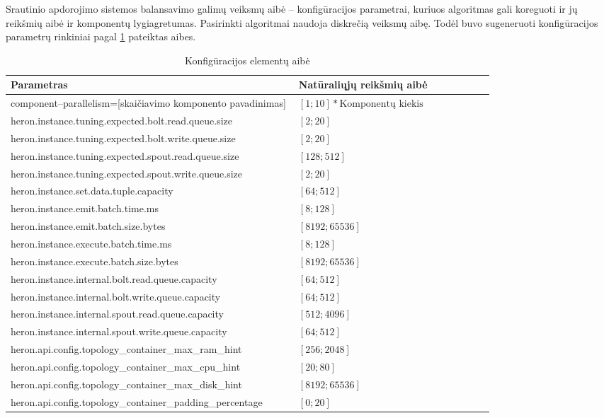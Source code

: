 \documentclass{VUMIFPSbakalaurinis}
\begin{document}
Srautinio apdorojimo sistemos balansavimo galimų veiksmų aibė – konfigūracijos parametrai, kuriuos algoritmas gali koreguoti ir jų reikšmių aibė ir komponentų lygiagretumas. Pasirinkti algoritmai naudoja diskrečią veiksmų aibę. Todėl buvo sugeneruoti konfigūracijos parametrų rinkiniai pagal \ref{param–table–pract} pateiktas aibes.

\begin{longtable}{|p{0.59\linewidth}|p{0.4\linewidth}|}
    \caption{Konfigūracijos elementų aibė}
    \label{param–table–pract}\\
    \hline
    \rowcolor[HTML]{C0C0C0} 
    Parametras     & Natūraliųjų reikšmių aibė       \\ \hline
    \endfirsthead
    \endhead
    component–parallelism=[skaičiavimo komponento pavadinimas]& \([1;10] * \text{Komponentų kiekis}\)\\ \hline
    heron.instance.tuning.expected.bolt.read.queue.size       & \([2;20]\) \\ \hline
    heron.instance.tuning.expected.bolt.write.queue.size      & \([2;20]\) \\ \hline
    heron.instance.tuning.expected.spout.read.queue.size      & \([128;512]\) \\ \hline
    heron.instance.tuning.expected.spout.write.queue.size     & \([2;20]\) \\ \hline
    heron.instance.set.data.tuple.capacity                    & \([64;512]\) \\ \hline
    heron.instance.emit.batch.time.ms                         & \([8;128]\) \\ \hline
    heron.instance.emit.batch.size.bytes                      & \([8192;65536]\) \\ \hline
    heron.instance.execute.batch.time.ms                      & \([8;128]\) \\ \hline
    heron.instance.execute.batch.size.bytes                   & \([8192;65536]\) \\ \hline
    heron.instance.internal.bolt.read.queue.capacity          & \([64;512]\) \\ \hline
    heron.instance.internal.bolt.write.queue.capacity         & \([64;512]\) \\ \hline
    heron.instance.internal.spout.read.queue.capacity         & \([512;4096]\) \\ \hline
    heron.instance.internal.spout.write.queue.capacity        & \([64;512]\) \\ \hline
    heron.api.config.topology\_container\_max\_ram\_hint      & \([256;2048]\) \\ \hline
    heron.api.config.topology\_container\_max\_cpu\_hint      & \([20;80]\) \\ \hline
    heron.api.config.topology\_container\_max\_disk\_hint     & \([8192;65536]\) \\ \hline
    heron.api.config.topology\_container\_padding\_percentage & \([0;20]\) \\ \hline
\end{longtable}
\end{document}
